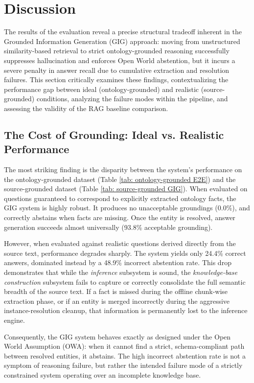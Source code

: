 \section{Discussion}
The results of the evaluation reveal a precise structural tradeoff inherent in the Grounded Information Generation (GIG) approach: moving from unstructured similarity-based retrieval to strict ontology-grounded reasoning successfully suppresses hallucination and enforces Open World abstention, but it incurs a severe penalty in answer recall due to cumulative extraction and resolution failures. This section critically examines these findings, contextualizing the performance gap between ideal (ontology-grounded) and realistic (source-grounded) conditions, analyzing the failure modes within the pipeline, and assessing the validity of the RAG baseline comparison.

\subsection{The Cost of Grounding: Ideal vs. Realistic Performance}
The most striking finding is the disparity between the system's performance on the ontology-grounded dataset (Table \ref{tab: ontology-grounded E2E}) and the source-grounded dataset (Table \ref{tab: source-grounded GIG}). When evaluated on questions guaranteed to correspond to explicitly extracted ontology facts, the GIG system is highly robust. It produces no unacceptable groundings (0.0\%), and correctly abstains when facts are missing. Once the entity is resolved, answer generation succeeds almost universally (93.8\% acceptable grounding).

However, when evaluated against realistic questions derived directly from the source text, performance degrades sharply. The system yields only 24.4\% correct answers, dominated instead by a 48.9\% incorrect abstention rate. This drop demonstrates that while the \textit{inference} subsystem is sound, the \textit{knowledge-base construction} subsystem fails to capture or correctly consolidate the full semantic breadth of the source text. If a fact is missed during the offline chunk-wise extraction phase, or if an entity is merged incorrectly during the aggressive instance-resolution cleanup, that information is permanently lost to the inference engine. 

Consequently, the GIG system behaves exactly as designed under the Open World Assumption (OWA): when it cannot find a strict, schema-compliant path between resolved entities, it abstains. The high incorrect abstention rate is not a symptom of reasoning failure, but rather the intended failure mode of a strictly constrained system operating over an incomplete knowledge base.

